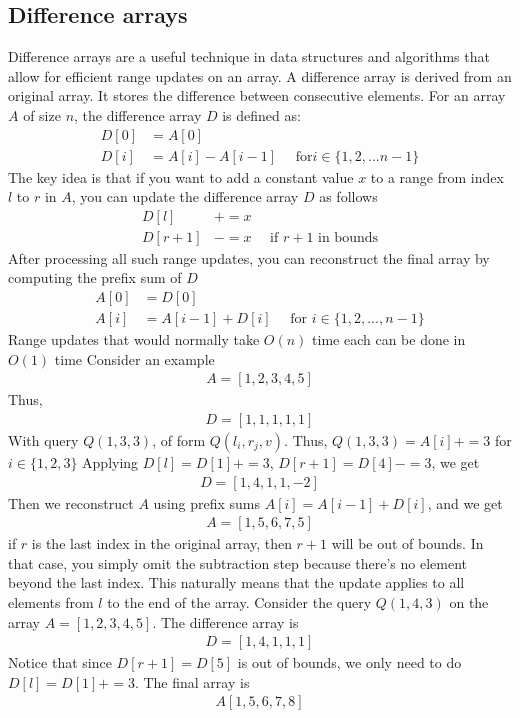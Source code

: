 \documentclass{report}
\begin{document}
\subsection{Difference arrays}
\bigbreak \noindent 
Difference arrays are a useful technique in data structures and algorithms that allow for efficient range updates on an array.
\bigbreak \noindent 
A difference array is derived from an original array. It stores the difference between consecutive elements. For an array $A$ of size $n$, the difference array $D$ is defined as:
\begin{align*}
    D[0] &= A[0] \\
    D[i] &= A[i] - A[i-1]  \quad \text{ for} i \in \{1,2,...n-1\}
\end{align*}
\bigbreak \noindent 
The key idea is that if you want to add a constant value $x$ to a range from index $l$ to $r$ in $A$, you can update the difference array $D$ as follows
\begin{align*}
    D[l] &+= x \\
    D[r+1] &-= x \quad \text{ if $r+1$ in bounds}
\end{align*}
After processing all such range updates, you can reconstruct the final array by computing the prefix sum of $D$
\begin{align*}
    A[0] &= D[0] \\
    A[i] &= A[i-1] + D[i] \quad \text{ for } i\in \{1,2,...,n-1\} 
\end{align*}
\bigbreak \noindent 
Range updates that would normally take $O(n)$ time each can be done in $O(1)$ time
\bigbreak \noindent 
Consider an example
\begin{align*}
    A = [1,2,3,4,5]
\end{align*}
Thus,
\begin{align*}
    D = [1,1,1,1,1]
\end{align*}
\bigbreak \noindent 
With query $Q(1,3,3)$, of form $Q(l_{i}, r_{j}, v)$. Thus, $Q(1,3,3)  = A[i]+=3$ for $i\in \{1,2,3\}$
\bigbreak \noindent 
Applying $D[l] = D[1] +=3$, $D[r+1]  = D[4]-=3$, we get
\begin{align*}
    D = [1,4,1,1,-2]
\end{align*}
Then we reconstruct $A$ using prefix sums $A[i] = A[i-1] + D[i]$, and we get
\begin{align*}
    A = [1,5,6,7,5] 
\end{align*}
\bigbreak \noindent 
if $r$ is the last index in the original array, then $r+1$ will be out of bounds. In that case, you simply omit the subtraction step because there's no element beyond the last index. This naturally means that the update applies to all elements from $l$ to the end of the array. Consider the query $Q(1,4,3)$ on the array $A = [1,2,3,4,5]$. The difference array is 
\begin{align*}
    D = [1,4,1,1,1]
\end{align*}
Notice that since $D[r+1] = D[5]$ is out of bounds, we only need to do $D[l] = D[1]+=3$. The final array is 
\begin{align*}
    A[1,5,6,7,8]
\end{align*}
\end{document}
